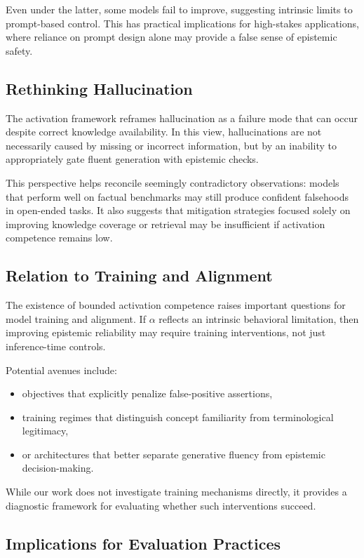 Even under the latter, some models fail to improve, suggesting intrinsic limits to prompt-based control. This has practical implications for high-stakes applications, where reliance on prompt design alone may provide a false sense of epistemic safety.


\subsection{Rethinking Hallucination}

The activation framework reframes hallucination as a failure mode that can occur despite correct knowledge availability. In this view, hallucinations are not necessarily caused by missing or incorrect information, but by an inability to appropriately gate fluent generation with epistemic checks.

This perspective helps reconcile seemingly contradictory observations: models that perform well on factual benchmarks may still produce confident falsehoods in open-ended tasks. It also suggests that mitigation strategies focused solely on improving knowledge coverage or retrieval may be insufficient if activation competence remains low.


\subsection{Relation to Training and Alignment}

The existence of bounded activation competence raises important questions for model training and alignment. If $\alpha$ reflects an intrinsic behavioral limitation, then improving epistemic reliability may require training interventions, not just inference-time controls.

Potential avenues include:
\begin{itemize}
    \item objectives that explicitly penalize false-positive assertions,
    \item training regimes that distinguish concept familiarity from terminological legitimacy,
    \item or architectures that better separate generative fluency from epistemic decision-making.
\end{itemize}

While our work does not investigate training mechanisms directly, it provides a diagnostic framework for evaluating whether such interventions succeed.


\subsection{Implications for Evaluation Practices}

